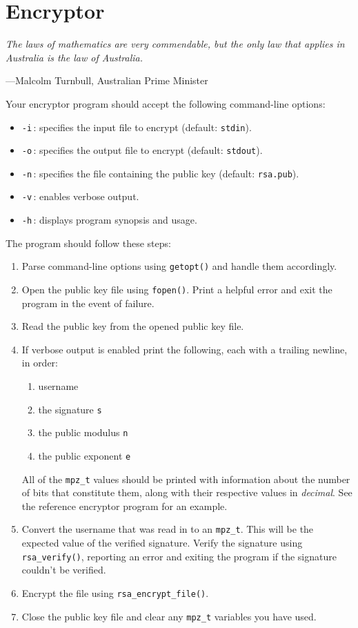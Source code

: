 \section{Encryptor}
\epigraph{\emph{The laws of mathematics are very commendable, but the only law that
applies in Australia is the law of Australia.}}{---Malcolm Turnbull, Australian Prime Minister}

Your encryptor program should accept the following command-line options:
\begin{itemize}
  \item \texttt{-i}\,: specifies the input file to encrypt (default:
    \texttt{stdin}).
  \item \texttt{-o}\,: specifies the output file to encrypt (default:
    \texttt{stdout}).
  \item \texttt{-n}\,: specifies the file containing the public key
    (default: \texttt{rsa.pub}).
  \item \texttt{-v}\,: enables verbose output.
  \item \texttt{-h}\,: displays program synopsis and usage.
\end{itemize}
The program should follow these steps:
\begin{enumerate}
  \item Parse command-line options using \texttt{getopt()} and handle
    them accordingly.
  \item Open the public key file using \texttt{fopen()}. Print a helpful
    error and exit the program in the event of failure.
  \item Read the public key from the opened public key file.
  \item If verbose output is enabled print the following, each with a
    trailing newline, in order:
    \begin{enumerate}
      \item username
      \item the signature \texttt{s}
      \item the public modulus \texttt{n}
      \item the public exponent \texttt{e}
    \end{enumerate}
    All of the \texttt{mpz\_t} values should be printed with information
    about the number of bits that constitute them, along with their
    respective values in \emph{decimal}. See the reference encryptor
    program for an example.
  \item Convert the username that was read in to an \texttt{mpz\_t}.
    This will be the expected value of the verified signature. Verify
    the signature using \texttt{rsa\_verify()}, reporting an error and
    exiting the program if the signature couldn't be verified.
  \item Encrypt the file using \texttt{rsa\_encrypt\_file()}.
  \item Close the public key file and clear any \texttt{mpz\_t}
    variables you have used.
\end{enumerate}
